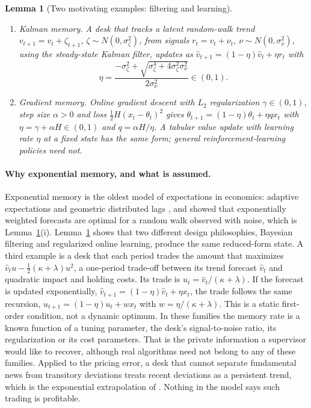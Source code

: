 \documentclass[12pt]{article}
\newtheorem{lemma}[theorem]{Lemma}
\theoremstyle{definition}
\theoremstyle{remark}
\begin{document}
\begin{lemma}[Two motivating examples: filtering and learning]\label{lem:micro}
\begin{enumerate}[label=(\roman*)]
\item \emph{Kalman memory.} A desk that tracks a latent random-walk trend $v_{t+1}=v_t+\zeta_{t+1}$, $\zeta\sim N(0,\sigma_\zeta^2)$, from signals $r_t=v_t+\nu_t$, $\nu\sim N(0,\sigma_\nu^2)$, using the steady-state Kalman filter, updates as $\hat v_{t+1}=(1-\eta)\hat v_t+\eta r_t$ with
\begin{equation}\label{eq:kgain}
\eta=\frac{-\sigma_\zeta^2+\sqrt{\sigma_\zeta^4+4\sigma_\zeta^2\sigma_\nu^2}}{2\sigma_\nu^2}\in(0,1).
\end{equation}
\item \emph{Gradient memory.} Online gradient descent with $L_2$ regularization $\gamma\in(0,1)$, step size $\alpha>0$ and loss $\tfrac12H(x_t-\theta_t)^2$ gives $\theta_{t+1}=(1-\eta)\theta_t+\eta q x_t$ with $\eta=\gamma+\alpha H\in(0,1)$ and $q=\alpha H/\eta$. A tabular value update with learning rate $\eta$ at a fixed state has the same form; general reinforcement-learning policies need not.
\end{enumerate}
\end{lemma}

\paragraph{Why exponential memory, and what is assumed.} Exponential memory is the oldest model of expectations in economics: adaptive expectations \citep{cagan1956,nerlove1958} and geometric distributed lags \citep{koyck1954}, and \citet{muth1960} showed that exponentially weighted forecasts are optimal for a random walk observed with noise, which is Lemma~\ref{lem:micro}(i). Lemma~\ref{lem:micro} shows that two different design philosophies, Bayesian filtering and regularized online learning, produce the same reduced-form state. A third example is a desk that each period trades the amount that maximizes $\hat v_tu-\tfrac12(\kappa+\lambda)u^2$, a one-period trade-off between its trend forecast $\hat v_t$ and quadratic impact and holding costs. Its trade is $u_t=\hat v_t/(\kappa+\lambda)$. If the forecast is updated exponentially, $\hat v_{t+1}=(1-\eta)\hat v_t+\eta x_t$, the trade follows the same recursion, $u_{t+1}=(1-\eta)u_t+wx_t$ with $w=\eta/(\kappa+\lambda)$. This is a static first-order condition, not a dynamic optimum. In these families the memory rate is a known function of a tuning parameter, the desk's signal-to-noise ratio, its regularization or its cost parameters. That is the private information a supervisor would like to recover, although real algorithms need not belong to any of these families. Applied to the pricing error, a desk that cannot separate fundamental news from transitory deviations treats recent deviations as a persistent trend, which is the exponential extrapolation of \citet{barberis2015,barberis2018}. Nothing in the model says such trading is profitable.
\end{document}
